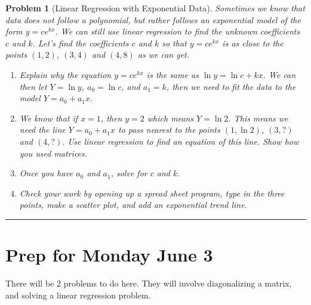 \documentclass[letterpaper,oneside]{book}%
\theoremstyle{plain}
\theoremstyle{box}
\theoremstyle{problem}
\newtheorem{problemnum}{Problem}[chapter]
\newtheorem*{hwenum*}{Home Work Practice}
\newenvironment{problem}[1][]{\begin{problemnum}[#1]}{\end{problemnum}\nopagebreak\hrule\bigskip}
\newenvironment{hw*}[1][]{\begin{hwenum*}[#1]}{\end{hwenum*}\nopagebreak\hrule\bigskip}
\begin{document}
\begin{problem}[Linear Regression with Exponential Data]
 Sometimes we know that data does not follow a polynomial, but rather follows an exponential model of the form $y=ce^{kx}$.  We can still use linear regression to find the unknown coefficients $c$ and $k$.  Let's find the coefficients $c$ and $k$ so that $y=ce^{kx}$ is as close to the points $(1,2)$, $(3,4)$ and $(4,8)$ as we can get.
 \begin{enumerate}
  \item Explain why the equation $y=ce^{kx}$ is the same as $\ln y = \ln c+kx$. We can then let $Y=\ln y$, $a_0=\ln c$, and $a_1=k$, then we need to fit the data to the model $Y=a_0+a_1x$.  
  \item We know that if $x=1$, then $y=2$ which means $Y=\ln 2$.  This means we need the line $Y=a_0+a_1x$ to pass nearest to the points $(1,\ln 2)$, $(3,?)$ and $(4,?)$.  Use linear regression to find an equation of this line. Show how you used matrices.
  \item Once you have $a_0$ and $a_1$, solve for $c$ and $k$. 
  \item Check your work by opening up a spread sheet program, type in the three points, make a scatter plot, and add an exponential trend line. 
 \end{enumerate}
\end{problem}




\section{Prep for Monday June 3}

\begin{hw*}
 There will be 2 problems to do here.  They will involve diagonalizing a matrix, and solving a linear regression problem.
\end{hw*}
\end{document}
